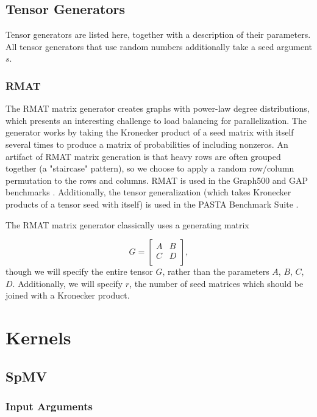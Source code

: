 \documentclass{article}
\begin{document}
\subsection{Tensor Generators}

    Tensor generators are listed here, together with a description of their
    parameters. All tensor generators that use random numbers additionally take a
	seed argument $s$. 

\subsubsection{RMAT}
    The RMAT matrix generator \cite{chakrabarti_r-mat_2004} creates graphs with
    power-law degree distributions, which presents an interesting challenge to
    load balancing for parallelization. The generator works by taking the
    Kronecker product of a seed matrix with itself several times to produce a
    matrix of probabilities of including nonzeros. An artifact of RMAT matrix
    generation is that heavy rows are often grouped together (a "staircase"
    pattern), so we choose to apply a random row/column permutation to the rows
    and columns. RMAT is used in the Graph500 and GAP benchmarks
    \cite{noauthor_graph_nodate, beamer_gap_2017}. Additionally, the tensor
    generalization (which takes Kronecker products of a tensor seed with itself)
    is used in the PASTA Benchmark Suite \cite{li_pasta_2019}.

    The RMAT matrix generator classically uses a generating matrix

	\[
		G = \left[\begin{array}{cc}
			A & B \\
			C & D \\
		\end{array}\right],
	\]
	though we will specify the entire tensor $G$, rather than the parameters
	$A$, $B$, $C$, $D$. Additionally, we will specify $r$, the number of seed
	matrices which should be joined with a Kronecker product.

\section{Kernels}

\subsection{SpMV}

\subsubsection{Input Arguments}
\end{document}
